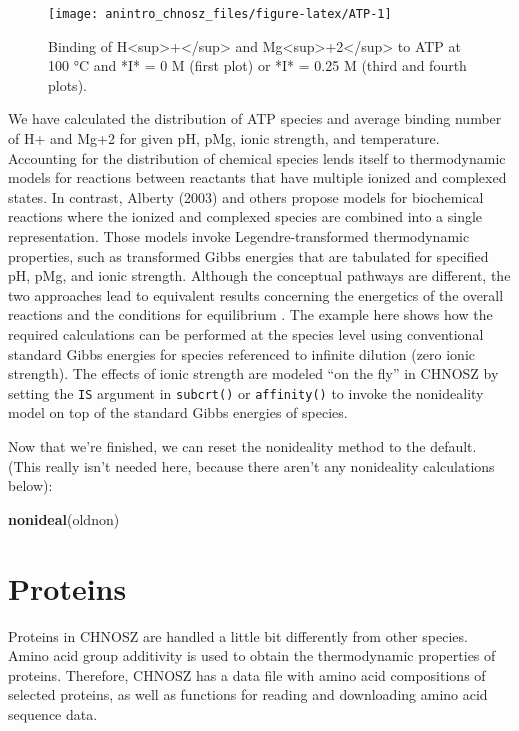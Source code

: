 \documentclass[]{tufte-book}
\newenvironment{Shaded}{}{}
\newcommand{\KeywordTok}[1]{\textcolor[rgb]{0.00,0.44,0.13}{\textbf{#1}}}
\newcommand{\NormalTok}[1]{#1}
\begin{document}
\begin{figure}
\texttt{[image: anintro\_chnosz\_files/figure-latex/ATP-1]} \caption[Binding of H<sup>+</sup> and Mg<sup>+2</sup> to ATP at 100 °C and *I* = 0 M (first plot) or *I* = 0.25 M (third and fourth plots)]{Binding of H<sup>+</sup> and Mg<sup>+2</sup> to ATP at 100 °C and *I* = 0 M (first plot) or *I* = 0.25 M (third and fourth plots).}\label{fig:ATP}
\end{figure}

We have calculated the distribution of ATP species and average binding
number of H+ and Mg+2 for given pH, pMg, ionic strength, and
temperature. Accounting for the distribution of chemical species lends
itself to thermodynamic models for reactions between reactants that have
multiple ionized and complexed states. In contrast, Alberty (2003) and
others propose models for biochemical reactions where the ionized and
complexed species are combined into a single representation. Those
models invoke Legendre-transformed thermodynamic properties, such as
transformed Gibbs energies that are tabulated for specified pH, pMg, and
ionic strength. Although the conceptual pathways are different, the two
approaches lead to equivalent results concerning the energetics of the
overall reactions and the conditions for equilibrium \citep{SVI12}. The
example here shows how the required calculations can be performed at the
species level using conventional standard Gibbs energies for species
referenced to infinite dilution (zero ionic strength). The effects of
ionic strength are modeled ``on the fly'' in CHNOSZ by setting the
\texttt{IS} argument in {\texttt{subcrt()}} or {\texttt{affinity()}} to
invoke the nonideality model on top of the standard Gibbs energies of
species.

Now that we're finished, we can reset the nonideality method to the
default. (This really isn't needed here, because there aren't any
nonideality calculations below):

\begin{Shaded}
\begin{Highlighting}[]
\KeywordTok{nonideal}\NormalTok{(oldnon)}
\end{Highlighting}
\end{Shaded}

\chapter{Proteins}\label{proteins}

Proteins in CHNOSZ are handled a little bit differently from other
species. Amino acid group additivity is used to obtain the thermodynamic
properties of proteins. Therefore, CHNOSZ has a data file with amino
acid compositions of selected proteins, as well as functions for reading
and downloading amino acid sequence data.
\end{document}
